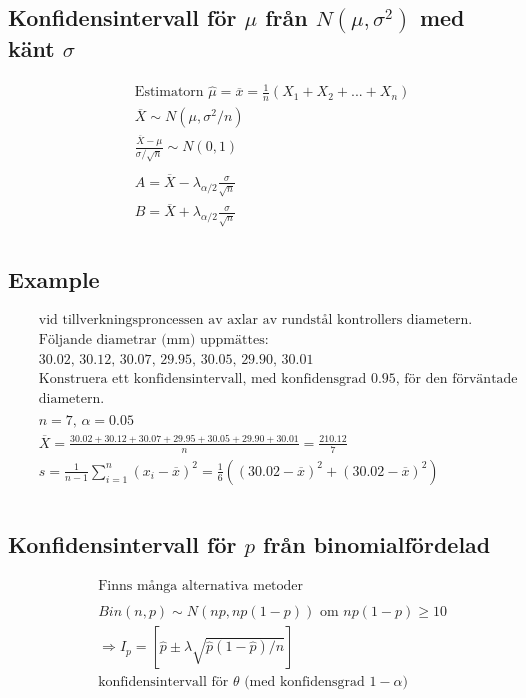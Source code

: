 \subsection{Konfidensintervall för $\mu$ från $N(\mu,\sigma^2)$ med känt $\sigma$}
\begin{align*}
  &\quad  \text{Estimatorn } \hat{\mu}=\overline{x}=\frac{1}{n}(X_1+X_2+...+X_n) \\
  &\quad  \overline{X}\sim{N(\mu,\sigma^2/n)} \\
  &\quad  \frac{\overline{X}-\mu}{\sigma/\sqrt{n}}\sim{N(0,1)} \\
  &\quad  \\
  &\quad  A=\overline{X}-\lambda_{\alpha/2}\frac{\sigma}{\sqrt{n}} \\
  &\quad  B=\overline{X}+\lambda_{\alpha/2}\frac{\sigma}{\sqrt{n}} \\
\end{align*}

\subsection{Example}
\begin{align*}
  &\quad  \text{vid tillverkningsproncessen av axlar av rundstål kontrollers diametern.} \\
  &\quad  \text{Följande diametrar (mm) uppmättes:} \\
  &\quad  30.02, \, 30.12, \, 30.07, \, 29.95, \, 30.05, \, 29.90, \, 30.01 \\
  &\quad  \text{Konstruera ett konfidensintervall, med konfidensgrad $0.95$, för den förväntade} \\
  &\quad  \text{diametern.} \\
  &\quad  \\
  &\quad  n=7, \, \alpha=0.05 \\
  &\quad  \overline{X}=\frac{30.02+30.12+30.07+29.95+30.05+29.90+30.01}{n}=\frac{210.12}{7} \\
  &\quad  s=\frac{1}{n-1}\sum_{i=1}^n(x_i-\overline{x})^2 = \frac{1}{6}((30.02-\overline{x})^2 + (30.02-\overline{x})^2) \\
  &\quad  \\
\end{align*}

\subsection{Konfidensintervall för $p$ från binomialfördelad}
\begin{align*}
  &\quad  \text{Finns många alternativa metoder}  \\
  &\quad  \\
  &\quad  Bin(n,p)\sim{N(np,np(1-p))} \text{ om } np(1-p)\geq10 \\
  &\quad  \Rightarrow I_p=[\hat{p}\pm\lambda\sqrt{\hat{p}(1-\hat{p})/n}] \\
  &\quad  \text{konfidensintervall för $\theta$ (med konfidensgrad $1-\alpha$)} \\
\end{align*}

